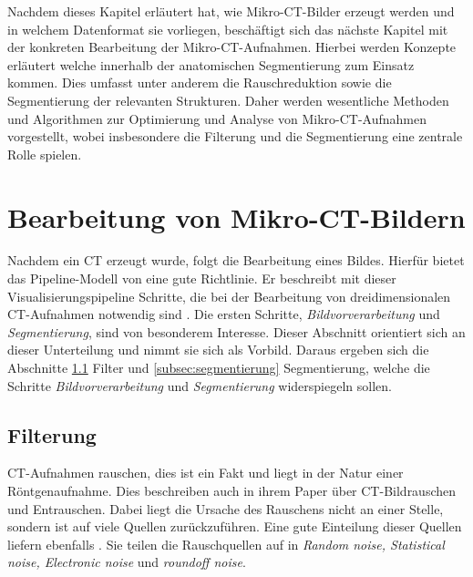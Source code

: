 Nachdem dieses Kapitel erläutert hat, wie Mikro-\ac{CT}-Bilder erzeugt werden
und in welchem Datenformat sie vorliegen, beschäftigt sich das nächste Kapitel mit
der konkreten Bearbeitung der Mikro-\ac{CT}-Aufnahmen. Hierbei werden Konzepte erläutert
welche innerhalb der anatomischen Segmentierung zum Einsatz kommen. Dies umfasst
unter anderem die Rauschreduktion sowie die Segmentierung der relevanten
Strukturen. Daher werden wesentliche Methoden und Algorithmen zur Optimierung und
Analyse von Mikro-\ac{CT}-Aufnahmen vorgestellt, wobei insbesondere die Filterung
und die Segmentierung eine zentrale Rolle spielen.

\pagebreak

\section{Bearbeitung von Mikro-CT-Bildern}
\label{sec:bildbearbeitung} Nachdem ein \ac{CT} erzeugt wurde, folgt die
Bearbeitung eines Bildes. Hierfür bietet das Pipeline-Modell von \citet[S.~50]{handels2000}
eine gute Richtlinie. Er beschreibt mit dieser Visualisierungspipeline Schritte,
die bei der Bearbeitung von dreidimensionalen \ac{CT}-Aufnahmen notwendig sind \citep[vgl.][S.~50]{handels2000}.
Die ersten Schritte, \textit{Bildvorverarbeitung} und \textit{Segmentierung}, sind
von besonderem Interesse. Dieser Abschnitt orientiert sich an dieser
Unterteilung und nimmt sie sich als Vorbild. Daraus ergeben sich die Abschnitte \ref{subsec:filter}
Filter und \ref{subsec:segmentierung} Segmentierung, welche die Schritte \textit{Bildvorverarbeitung}
und \textit{Segmentierung} widerspiegeln sollen.

\subsection{Filterung}
\label{subsec:filter} \ac{CT}-Aufnahmen rauschen, dies ist ein Fakt und liegt in
der Natur einer Röntgenaufnahme. Dies beschreiben auch \citet[K.~3]{diwakar2018}
in ihrem Paper über \ac{CT}-Bildrauschen und Entrauschen. Dabei liegt die
Ursache des Rauschens nicht an einer Stelle, sondern ist auf viele Quellen zurückzuführen.
Eine gute Einteilung dieser Quellen liefern ebenfalls \citet[K.~3]{diwakar2018}.
Sie teilen die Rauschquellen auf in \textit{Random noise, Statistical noise,
Electronic noise} und \textit{roundoff noise}.

